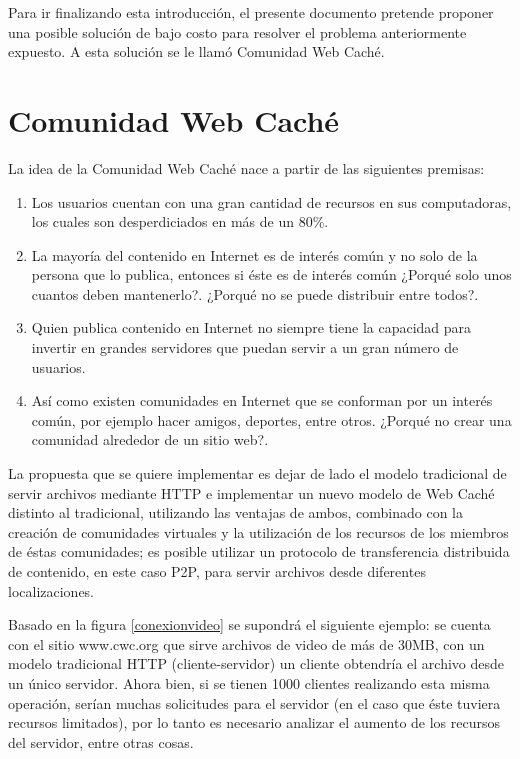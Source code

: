 Para ir finalizando esta introducción, el presente documento pretende proponer una posible solución de bajo costo para resolver el problema anteriormente expuesto. A esta solución se le llamó Comunidad Web Caché. 


\section{Comunidad Web Caché}

La idea de la Comunidad Web Caché nace a partir de las siguientes premisas:

\begin{enumerate}
\item Los usuarios cuentan con una gran cantidad de recursos en sus computadoras, los cuales son desperdiciados en más de un 80\%.
\item La mayoría del contenido en Internet es de interés común y no solo de la persona que lo publica, entonces si éste es de interés común ¿Porqué solo unos cuantos deben mantenerlo?. ¿Porqué no se puede distribuir entre todos?.
\item Quien publica contenido en Internet no siempre tiene la capacidad para invertir en grandes servidores que puedan servir a un gran número de usuarios.
\item Así como existen comunidades en Internet que se conforman por un interés común, por ejemplo hacer amigos, deportes, entre otros. ¿Porqué no crear una comunidad alrededor de un sitio web?.
\end{enumerate}

La propuesta que se quiere implementar es dejar de lado el modelo tradicional de servir archivos mediante HTTP e implementar un nuevo modelo de Web Caché distinto al tradicional, utilizando las ventajas de ambos, combinado con la creación de comunidades virtuales y la utilización de los recursos de los miembros de éstas comunidades; es posible utilizar un protocolo de transferencia distribuida de contenido, en este caso P2P, para servir archivos desde diferentes localizaciones.

Basado en la figura \ref{conexionvideo} se supondrá el siguiente ejemplo: se cuenta con el sitio www.cwc.org que sirve archivos de video de más de 30MB, con un modelo tradicional HTTP (cliente-servidor) un cliente obtendría el archivo desde un único servidor. Ahora bien, si se tienen 1000 clientes realizando esta misma operación, serían muchas solicitudes para el servidor (en el caso que éste tuviera recursos limitados), por lo tanto es necesario analizar el aumento de los recursos del servidor, entre otras cosas. 


